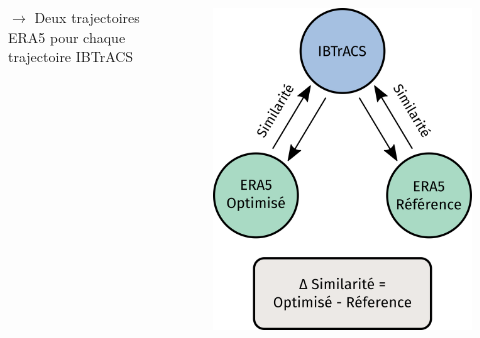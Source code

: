 \documentclass[aspectratio=169, usepdftitle=false, xcolor={dvipsnames}, 9pt,table]{beamer}
\begin{document}
\begin{frame}[c]
\begin{columns}
\begin{column}{0.6\textwidth}
\begin{block}
\begin{itemize}
\begin{itemize}
                        \end{itemize}
               \end{itemize}
               $\longrightarrow$ \alert{Deux trajectoires} ERA5 pour chaque trajectoire IBTrACS
           \end{block}
        \end{column}
        \begin{column}{0.4\textwidth}
            \vspace{-2em} 
            \begin{figure}
                \centering
                \includegraphics[width=\textwidth]{Figures/schema_application_similarite.png}
            \end{figure} 
        \end{column}
    \end{columns}
\end{frame}
\end{document}
